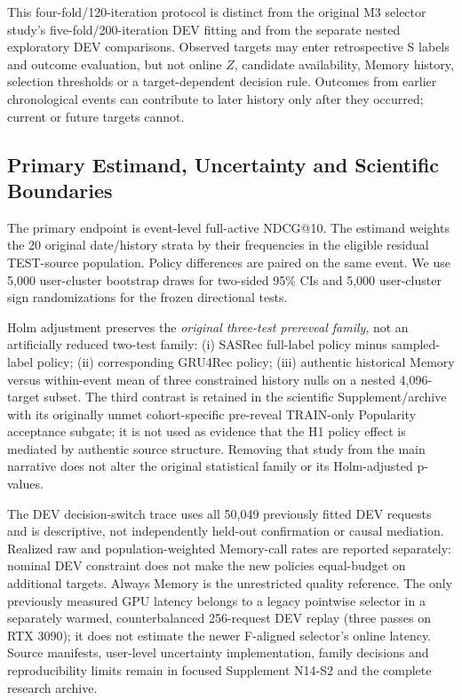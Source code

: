 \documentclass[preprint,12pt]{elsarticle}
\begin{document}
This four-fold/120-iteration protocol is distinct from the original M3 selector study's five-fold/200-iteration DEV fitting and from the separate nested exploratory DEV comparisons. Observed targets may enter retrospective S labels and outcome evaluation, but not online $Z$, candidate availability, Memory history, selection thresholds or a target-dependent decision rule. Outcomes from earlier chronological events can contribute to later history only after they occurred; current or future targets cannot.

\subsection{Primary Estimand, Uncertainty and Scientific Boundaries}
\label{sec:exp-statistics}
\label{sec:exp-implementation}
\label{sec:exp-regimes}

The primary endpoint is event-level full-active NDCG@10. The estimand weights the 20 original date/history strata by their frequencies in the eligible residual TEST-source population. Policy differences are paired on the same event. We use 5,000 user-cluster bootstrap draws for two-sided 95\% CIs and 5,000 user-cluster sign randomizations for the frozen directional tests.

Holm adjustment preserves the \emph{original three-test prereveal family}, not an artificially reduced two-test family: (i) SASRec full-label policy minus sampled-label policy; (ii) corresponding GRU4Rec policy; (iii) authentic historical Memory versus within-event mean of three constrained history nulls on a nested 4,096-target subset. The third contrast is retained in the scientific Supplement/archive with its originally unmet cohort-specific pre-reveal TRAIN-only Popularity acceptance subgate; it is not used as evidence that the H1 policy effect is mediated by authentic source structure. Removing that study from the main narrative does not alter the original statistical family or its Holm-adjusted p-values.

The DEV decision-switch trace uses all 50,049 previously fitted DEV requests and is descriptive, not independently held-out confirmation or causal mediation. Realized raw and population-weighted Memory-call rates are reported separately: nominal DEV constraint does not make the new policies equal-budget on additional targets. Always Memory is the unrestricted quality reference. The only previously measured GPU latency belongs to a legacy pointwise selector in a separately warmed, counterbalanced 256-request DEV replay (three passes on RTX 3090); it does not estimate the newer F-aligned selector's online latency. Source manifests, user-level uncertainty implementation, family decisions and reproducibility limits remain in focused Supplement N14-S2 and the complete research archive.
\end{document}

